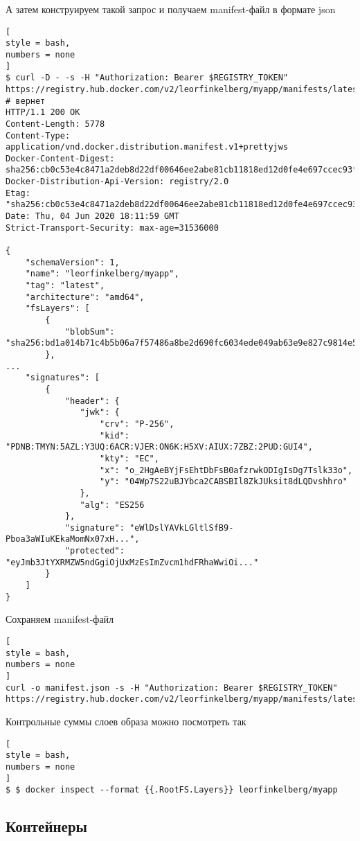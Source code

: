 \documentclass[%
	11pt,
	a4paper,
	utf8,
		]{article}
\begin{document}
А затем конструируем такой запрос и получаем manifest-файл в формате json
\begin{lstlisting}[
style = bash,
numbers = none
]
$ curl -D - -s -H "Authorization: Bearer $REGISTRY_TOKEN" https://registry.hub.docker.com/v2/leorfinkelberg/myapp/manifests/latest
# вернет
HTTP/1.1 200 OK
Content-Length: 5778
Content-Type: application/vnd.docker.distribution.manifest.v1+prettyjws
Docker-Content-Digest: sha256:cb0c53e4c8471a2deb8d22df00646ee2abe81cb11818ed12d0fe4e697ccec93f
Docker-Distribution-Api-Version: registry/2.0
Etag: "sha256:cb0c53e4c8471a2deb8d22df00646ee2abe81cb11818ed12d0fe4e697ccec93f"
Date: Thu, 04 Jun 2020 18:11:59 GMT
Strict-Transport-Security: max-age=31536000

{
    "schemaVersion": 1,
    "name": "leorfinkelberg/myapp",
    "tag": "latest",
    "architecture": "amd64",
    "fsLayers": [
        {
            "blobSum": "sha256:bd1a014b71c4b5b06a7f57486a8be2d690fc6034ede049ab63e9e827c9814e5a"
        },
...
    "signatures": [
        {
            "header": {
               "jwk": {
                   "crv": "P-256",
                   "kid": "PDNB:TMYN:5AZL:Y3UQ:6ACR:VJER:ON6K:H5XV:AIUX:7ZBZ:2PUD:GUI4",
                   "kty": "EC",
                   "x": "o_2HgAeBYjFsEhtDbFsB0afzrwkODIgIsDg7Tslk33o",
                   "y": "04Wp7S22uBJYbca2CABSBIl8ZkJUksit8dLQDvshhro"
               },
               "alg": "ES256
            },
            "signature": "eWlDslYAVkLGltlSfB9-Pboa3aWIuKEkaMomNx07xH...",
            "protected": "eyJmb3JtYXRMZW5ndGgiOjUxMzEsImZvcm1hdFRhaWwiOi..."
        }
    ]
}
\end{lstlisting}

Сохраняем manifest-файл
\begin{lstlisting}[
style = bash,
numbers = none
]
curl -o manifest.json -s -H "Authorization: Bearer $REGISTRY_TOKEN" https://registry.hub.docker.com/v2/leorfinkelberg/myapp/manifests/latest
\end{lstlisting}

Контрольные суммы слоев образа можно посмотреть так
\begin{lstlisting}[
style = bash,
numbers = none
]
$ $ docker inspect --format {{.RootFS.Layers}} leorfinkelberg/myapp
\end{lstlisting}


\subsection{Контейнеры}
\end{document}
